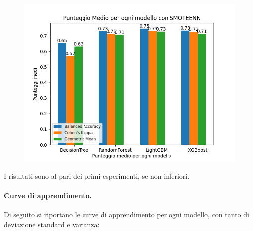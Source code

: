 \begin{figure}[H]
    \centering
    \includegraphics[scale=0.7]{img/smoteen_metrics.png}
\end{figure}

\noindent I risultati sono al pari dei primi esperimenti, se non inferiori.

\paragraph{Curve di apprendimento.} Di seguito si riportano le curve di apprendimento per ogni modello, con tanto di deviazione standard e varianza:

